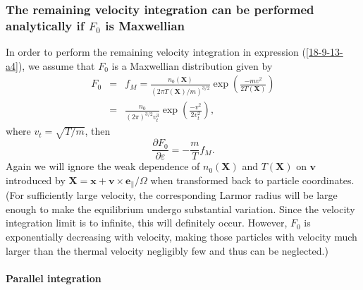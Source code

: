 \documentclass{llncs}
\begin{document}
\subsubsection{The remaining velocity integration can be performed
analytically if $F_0$ is Maxwellian}

In order to perform the remaining velocity integration in expression
(\ref{18-9-13-a4}), we assume that $F_0$ is a Maxwellian distribution given by
\begin{eqnarray}
  F_0 & = & f_M = \frac{n_0 (\mathbf{X})}{(2 \pi T (\mathbf{X}) / m)^{3 / 2}}
  \exp \left( \frac{- m v^2}{2 T (\mathbf{X})} \right) \\
  & = & \frac{n_0}{(2 \pi)^{3 / 2} v_t^3} \exp \left( \frac{- v^2}{2 v_t^2}
  \right), 
\end{eqnarray}
where $v_t = \sqrt{T / m}$, then
\begin{equation}
  \label{18-9-13-p6} \frac{\partial F_0}{\partial \varepsilon} = - \frac{m}{T}
  f_M .
\end{equation}
Again we will ignore the weak dependence of $n_0 (\mathbf{X})$ and $T
(\mathbf{X})$ on $\mathbf{v}$ introduced by $\mathbf{X}=\mathbf{x}+\mathbf{v}
\times \mathbf{e}_{\parallel} / \Omega$ when transformed back to particle
coordinates. (For sufficiently large velocity, the corresponding Larmor radius
will be large enough to make the equilibrium undergo substantial variation.
Since the velocity integration limit is to infinite, this will definitely
occur. However, $F_0$ is exponentially decreasing with velocity, making those
particles with velocity much larger than the thermal velocity negligibly few
and thus can be neglected.)

\paragraph{Parallel integration}
\end{document}

